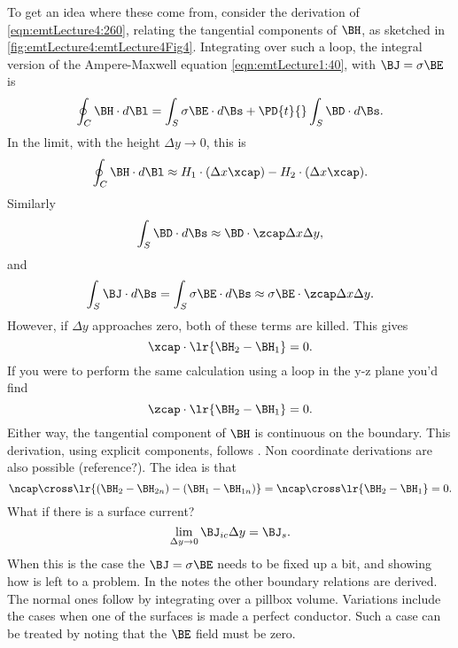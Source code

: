 %
To get an idea where these come from, consider the derivation of \cref{eqn:emtLecture4:260}, relating the tangential components of \( \BH \), as sketched in \cref{fig:emtLecture4:emtLecture4Fig4}.
%
%
Integrating over such a loop, the integral version of the Ampere-Maxwell equation \cref{eqn:emtLecture1:40}, with \( \BJ = \sigma \BE \) is
%
\begin{dmath}\label{eqn:emtLecture4:300}
\oint_C \BH \cdot d\Bl = \int_S \sigma \BE \cdot d\Bs + \PD{t}{} \int_S \BD \cdot d\Bs.
\end{dmath}
%
In the limit, with the height \( \Delta y \rightarrow 0 \), this is
%
\begin{dmath}\label{eqn:emtLecture4:320}
\oint_C \BH \cdot d\Bl
\approx
H_1 \cdot (\Delta x \xcap)
-H_2 \cdot (\Delta x \xcap).
\end{dmath}
%
Similarly
\begin{dmath}\label{eqn:emtLecture4:340}
\int_S \BD \cdot d\Bs
\approx
\BD \cdot \zcap \Delta x \Delta y,
\end{dmath}
%
and
\begin{equation}\label{eqn:emtLecture4:360}
\int_S \BJ \cdot d\Bs
=
\int_S \sigma \BE \cdot d\Bs
\approx
\sigma \BE \cdot \zcap \Delta x \Delta y.
\end{equation}
%
However, if \( \Delta y \) approaches zero, both of these terms are killed.
%
This gives
%
\begin{dmath}\label{eqn:emtLecture4:380}
\xcap \cdot \lr{ \BH_2 - \BH_1 } = 0.
\end{dmath}
%
If you were to perform the same calculation using a loop in the y-z plane you'd find
%
\begin{dmath}\label{eqn:emtLecture4:460}
\zcap \cdot \lr{ \BH_2 - \BH_1 } = 0.
\end{dmath}
%
Either way, the tangential component of \( \BH \) is continuous on the boundary.
%
This derivation, using explicit components, follows \citep{balanis1989advanced}.  Non coordinate derivations are also possible (reference?).
%
The idea is that
%
\begin{dmath}\label{eqn:emtLecture4:440}
\ncap \cross \lr{ (\BH_2 - \BH_{2n}) -(\BH_1 - \BH_{1n}) }
=
\ncap \cross \lr{ \BH_2 - \BH_1 }
= 0.
\end{dmath}
%
What if there is a surface current?
%
\begin{dmath}\label{eqn:emtLecture4:400}
\lim_{\Delta y \rightarrow 0} \BJ_{ic} \Delta y = \BJ_s.
\end{dmath}
%
When this is the case the \( \BJ = \sigma \BE \) needs to be fixed up a bit, and showing how is left to a problem.
%
In the notes the other boundary relations are derived.  The normal ones follow by integrating over a pillbox volume.
%
Variations include the cases when one of the surfaces is made a perfect conductor.  Such a case can be treated by noting that the \( \BE \) field must be zero.
%
